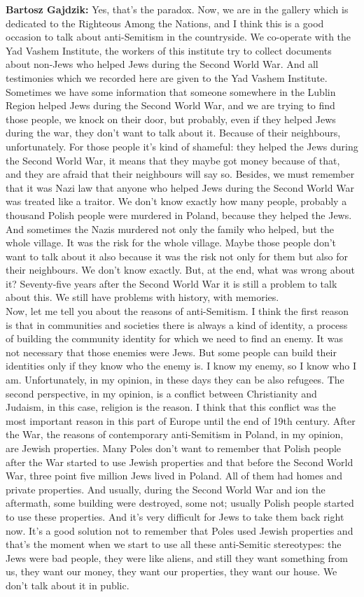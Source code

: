 \textbf{Bartosz Gajdzik:} Yes, that’s the paradox. Now, we are in the gallery which is dedicated to the Righteous Among the Nations, and I think this is a good occasion to talk about anti-Semitism in the countryside. We co-operate with the Yad Vashem Institute, the workers of this institute try to collect documents about non-Jews who helped Jews during the Second World War. And all testimonies which we recorded here are given to the Yad Vashem Institute. Sometimes we have some information that someone somewhere in the Lublin Region helped Jews during the Second World War, and we are trying to find those people, we knock on their door, but probably, even if they helped Jews during the war, they don’t want to talk about it. Because of their neighbours, unfortunately. For those people it’s kind of shameful: they helped the Jews during the Second World War, it means that they maybe got money because of that, and they are afraid that their neighbours will say so. Besides, we must remember that it was Nazi law that anyone who helped Jews during the Second World War was treated like a traitor. We don’t know exactly how many people, probably a thousand Polish people were murdered in Poland, because they helped the Jews. And sometimes the Nazis murdered not only the family who helped, but the whole village. It was the risk for the whole village. Maybe those people don’t want to talk about it also because it was the risk not only for them but also for their neighbours. We don’t know exactly. But, at the end, what was wrong about it? Seventy-five years after the Second World War it is still a problem to talk about this. We still have problems with history, with memories.\\  
Now, let me tell you about the reasons of anti-Semitism. I think the first reason is that in communities and societies there is always a kind of identity, a process of building the community identity for which we need to find an enemy. It was not necessary that those enemies were Jews. But some people can build their identities only if they know who the enemy is. I know my enemy, so I know who I am. Unfortunately, in my opinion, in these days they can be also refugees. The second perspective, in my opinion, is a conflict between Christianity and Judaism, in this case, religion is the reason. I think that this conflict was the most important reason in this part of Europe until the end of 19th century. After the War, the reasons of contemporary anti-Semitism in Poland, in my opinion, are Jewish properties. Many Poles don’t want to remember that Polish people after the War started to use Jewish properties and that before the Second World War, three point five million Jews lived in Poland. All of them had homes and private properties. And usually, during the Second World War and ion the aftermath, some building were destroyed, some not; usually Polish people started to use these properties. And it’s very difficult for Jews to take them back right now. It’s a good solution not to remember that Poles used Jewish properties and that’s the moment when we start to use all these anti-Semitic stereotypes: the Jews were bad people, they were like aliens, and still they want something from us, they want our money, they want our properties, they want our house. We don’t talk about it in public. 

